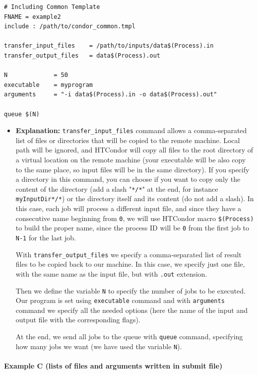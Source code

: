 \documentclass[a4paper,10pt]{article}
\begin{document}
\begin{verbatim}
# Including Common Template
FNAME = example2
include : /path/to/condor_common.tmpl

transfer_input_files    = /path/to/inputs/data$(Process).in
transfer_output_files   = data$(Process).out

N             = 50
executable    = myprogram
arguments     = "-i data$(Process).in -o data$(Process).out"

queue $(N)
\end{verbatim}

\begin{itemize}
\item \textbf{Explanation:}
\texttt{transfer\_input\_files} command allows a comma-separated list of files or
directories that will be copied to the remote machine. Local path will be
ignored, and HTCondor will copy all files to the root directory of a virtual
location on the remote machine (your executable will be also copy to the same
place, so input files will be in the same directory). If you specify a directory
in this command, you can choose if you want to copy only the content of the
directory (add a slash "\texttt{*/*}" at the end, for instance \texttt{myInputDir*/*}) or the
directory itself and its content (do not add a slash). In this case, each job
will process a different input file, and since they have a consecutive name
beginning from \texttt{0}, we will use HTCondor macro \texttt{\$(Process)} to build the proper
name, since the process ID will be \texttt{0} from the first job to \texttt{N-1} for the last
job.

With \texttt{transfer\_output\_files} we specify a comma-separated list of result files
to be copied back to our machine. In this case, we specify just one file, with
the same name as the input file, but with \texttt{.out} extension.

Then we define the variable \texttt{N} to specify the number of jobs to be
executed. Our program is set using \texttt{executable} command and with \texttt{arguments}
command we specify all the needed options (here the name of the input and output
file with the corresponding flags).

At the end, we send all jobs to the queue with \texttt{queue} command, specifying how
many jobs we want (we have used the variable \texttt{N}).
\end{itemize}


\paragraph{\textbf{Example C} (lists of files and arguments written in submit file)}
\label{sec:org10ff784}
\end{document}
